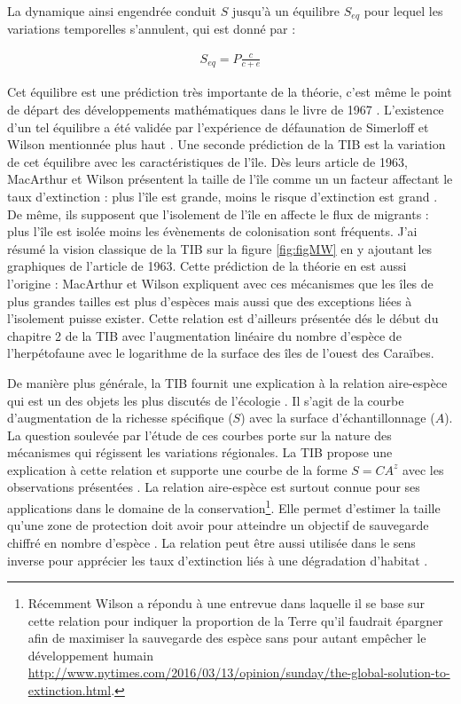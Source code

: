 La dynamique ainsi engendrée conduit \(S\) jusqu'à un équilibre
\(S_{eq}\) pour lequel les variations temporelles s'annulent, qui est
donné par :

\begin{eqnarray}
S_{eq} = P \frac{c}{c+e}
\end{eqnarray}

Cet équilibre est une prédiction très importante de la théorie, c'est
même le point de départ des développements mathématiques dans le livre
de 1967 \citep{MacArthur1967}. L'existence d'un tel équilibre a été
validée par l'expérience de défaunation de Simerloff et Wilson
mentionnée plus haut \citep{Simberloff1969}. Une seconde prédiction de
la TIB est la variation de cet équilibre avec les caractéristiques de
l'île. Dès leurs article de 1963, MacArthur et Wilson présentent la
taille de l'île comme un un facteur affectant le taux d'extinction :
plus l'île est grande, moins le risque d'extinction est grand
\citep{MacArthur1963}. De même, ils supposent que l'isolement de l'île
en affecte le flux de migrants : plus l'île est isolée moins les
évènements de colonisation sont fréquents. J'ai résumé la vision
classique de la TIB sur la figure \ref{fig:figMW} en y ajoutant les
graphiques de l'article de 1963. Cette prédiction de la théorie en est
aussi l'origine : MacArthur et Wilson expliquent avec ces mécanismes que
les îles de plus grandes tailles est plus d'espèces mais aussi que des
exceptions liées à l'isolement puisse exister. Cette relation est
d'ailleurs présentée dés le début du chapitre 2 de la TIB avec
l'augmentation linéaire du nombre d'espèce de l'herpétofaune avec le
logarithme de la surface des îles de l'ouest des Caraïbes.

De manière plus générale, la TIB fournit une explication à la relation
aire-espèce qui est un des objets les plus discutés de l'écologie
\citep{Lomolino2000a}. Il s'agit de la courbe d'augmentation de la
richesse spécifique (\(S\)) avec la surface d'échantillonnage (\(A\)).
La question soulevée par l'étude de ces courbes porte sur la nature des
mécanismes qui régissent les variations régionales. La TIB propose une
explication à cette relation et supporte une courbe de la forme
\(S=CA^z\) avec les observations présentées \citep{MacArthur1967}. La
relation aire-espèce est surtout connue pour ses applications dans le
domaine de la conservation\footnote{Récemment Wilson a répondu à une
  entrevue dans laquelle il se base sur cette relation pour indiquer la
  proportion de la Terre qu'il faudrait épargner afin de maximiser la
  sauvegarde des espèce sans pour autant empêcher le développement
  humain
  \url{http://www.nytimes.com/2016/03/13/opinion/sunday/the-global-solution-to-extinction.html}.}.
Elle permet d'estimer la taille qu'une zone de protection doit avoir
pour atteindre un objectif de sauvegarde chiffré en nombre d'espèce
\citep[\citet{Desmet2004}]{Neigel2003}. La relation peut être aussi
utilisée dans le sens inverse pour apprécier les taux d'extinction liés
à une dégradation d'habitat \citep{He2011}.

